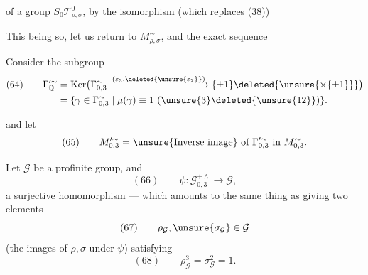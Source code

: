 

of a group   $S_0\mathcal{T}_{\rho,\sigma}^{0}$, by the isomorphism (which replaces (38))

This being so, let us return to $M_{\rho,\sigma}^{\sim}$, and the exact sequence

Consider the subgroup
\[
\begin{aligned}
(64)\qquad
\Gamma_{\mathbb Q}^{\prime\sim}
 &= \operatorname{Ker}\bigl(\Gamma_{0,3}^{\sim}
 \xrightarrow{(\varepsilon_3,\deleted{\unsure{\varepsilon_2}})}
 \{\pm1\}\deleted{\unsure{\times\{\pm1\}}}\bigr)\\
 &= \{\gamma\in\Gamma_{0,3}^{\sim}\mid\mu(\gamma)\equiv1\ (\unsure{3}\deleted{\unsure{12}})\}.
\end{aligned}
\]

and let 
\[
 (65)\qquad M_{0,3}^{\prime\sim}
 = \text{\unsure{Inverse image} of }\Gamma_{0,3}^{\prime\sim}\text{ in }M_{0,3}^{\sim}.
\]

Let $\mathcal{G}$ be a profinite group, and
\[
 (66)\qquad\psi:\mathcal{G}_{0,3}^{+\wedge}\longrightarrow\mathcal{G},
\]
a  surjective homomorphism --- which amounts to the same thing as giving two elements
\[
 (67)\qquad\rho_{\mathcal{G}},\unsure{\sigma_{\mathcal{G}}}\in\mathcal{G}
\]
(the images of $\rho,\sigma$ under $\psi$) satisfying
\[
 (68)\qquad\rho_{\mathcal{G}}^3=\sigma_{\mathcal{G}}^2=1.
\]


